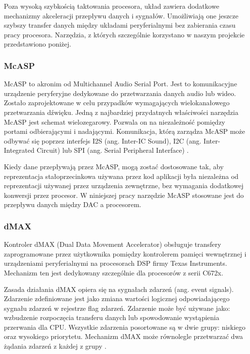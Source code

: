 Poza wysoką szybkością taktowania procesora, układ zawiera dodatkowe mechanizmy akceleracji przepływu danych i sygnałów. Umożliwiają one jeszcze szybszy transfer danych między układami peryferialnymi bez zabierania czasu pracy procesora. Narzędzia, z których szczególnie korzystano w naszym projekcie przedstawiono poniżej.

\subsubsection{McASP}
McASP to akronim od Multichannel Audio Serial Port. Jest to komunikacyjne urządzenie peryferyjne dedykowane do przetwarzania danych audio lub wideo. Zostało zaprojektowane w celu przypadków wymagających wielokanałowego przetwarzania dźwięku. Jedną z najbardziej przydatnych właściwości narzędzia McASP jest schemat wielozegarowy. Pozwala on na niezależność pomiędzy portami odbierającymi i nadającymi. Komunikacja, którą zarządza McASP może odbywać się poprzez interfejs I2S (ang. Inter-IC Sound), I2C (ang. Inter-Integrated Circuit) lub SPI (ang. Serial Peripheral Interface) \cite{dokumentacja_mcasp}.

Kiedy dane przepływają przez McASP, mogą zostać dostosowane tak, aby reprezentacja stałoprzecinkowa używana przez kod aplikacji była niezależna od reprezentacji używanej przez urządzenia zewnętrzne, bez wymagania dodatkowej konwersji przez procesor.
W niniejszej pracy narzędzie McASP stosowane jest do przepływu danych między DAC a procesorem. 

\subsubsection{dMAX} \label{par:dMax}
Kontroler dMAX (Dual Data Movement Accelerator) obsługuje transfery zaprogramowane przez użytkownika pomiędzy kontrolerem pamięci wewnętrznej i urządzeniami peryferialnymi na procesorach DSP firmy Texas Instruments. Mechanizm ten jest dedykowany szczególnie dla procesorów z serii C672x.

Zasada działania dMAX opiera się na sygnałach zdarzeń (ang. event signals). Zdarzenie zdefiniowane jest jako zmiana wartości logicznej odpowiadającego sygnału zdarzeń w rejestrze flag zdarzeń. Zdarzenie może być używane jako: wzbudzenie rozpoczęcia transferu danych lub spowodowanie wystąpienia przerwania dla CPU. Wszystkie zdarzenia posortowane są w dwie grupy: niskiego oraz wysokiego priorytetu. Mechanizm dMAX może równolegle przetwarzać dwa żądania zdarzeń z każdej z grupy \cite{dokumentacja_dmax}.

